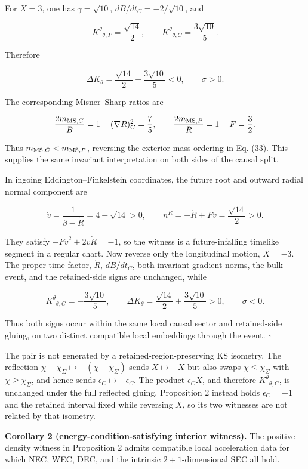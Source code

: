 \documentclass[pdflatex,sn-mathphys-num]{sn-jnl}
\begin{document}
For \(X=3\), one has \(\gamma=\sqrt{10}\), \(dB/dt_C=-2/\sqrt{10}\), and


\[
K^\theta{}_{\theta,P}=\frac{\sqrt{14}}2,
\qquad
K^\theta{}_{\theta,C}=\frac{3\sqrt{10}}5.
\]

Therefore


\[
\Delta K_\theta
=\frac{\sqrt{14}}2-\frac{3\sqrt{10}}5<0,
\qquad
\sigma>0.
\]

The corresponding Misner--Sharp ratios are


\[
\frac{2m_{{\rm MS},C}}{B}
=1-(\nabla R)^2_C
=\frac75,
\qquad
\frac{2m_{{\rm MS},P}}{R}
=1-F
=\frac32.
\]

Thus \(m_{{\rm MS},C}<m_{{\rm MS},P}\), reversing the exterior mass ordering in Eq. (33). This supplies the same invariant interpretation on both sides of the causal split.


In ingoing Eddington--Finkelstein coordinates, the future root and outward radial normal component are


\[
\dot v=\frac{1}{\beta-\dot R}=4-\sqrt{14}>0,
\qquad
n^R=-\dot R+F\dot v=\frac{\sqrt{14}}2>0.
\]

They satisfy \(-F\dot v^2+2\dot v\dot R=-1\), so the witness is a future-infalling timelike segment in a regular chart. Now reverse only the longitudinal motion, \(X=-3\). The proper-time factor, \(\dot R\), \(dB/dt_C\), both invariant gradient norms, the bulk event, and the retained-side signs are unchanged, while


\[
K^\theta{}_{\theta,C}=-\frac{3\sqrt{10}}5,
\qquad
\Delta K_\theta
=\frac{\sqrt{14}}2+\frac{3\sqrt{10}}5>0,
\qquad
\sigma<0.
\]

Thus both signs occur within the same local causal sector and retained-side gluing, on two distinct compatible local embeddings through the event. \(\square\)


The pair is not generated by a retained-region-preserving KS isometry. The reflection \(\chi-\chi_\Sigma\mapsto-(\chi-\chi_\Sigma)\) sends \(X\mapsto-X\) but also swaps \(\chi\le\chi_\Sigma\) with \(\chi\ge\chi_\Sigma\), and hence sends \(\epsilon_C\mapsto-\epsilon_C\). The product \(\epsilon_CX\), and therefore \(K^\theta{}_{\theta,C}\), is unchanged under the full reflected gluing. Proposition 2 instead holds \(\epsilon_C=-1\) and the retained interval fixed while reversing \(X\), so its two witnesses are not related by that isometry.


\textbf{Corollary 2 (energy-condition-satisfying interior witness).} The positive-density witness in Proposition 2 admits compatible local acceleration data for which NEC, WEC, DEC, and the intrinsic \(2+1\)-dimensional SEC all hold.
\end{document}
